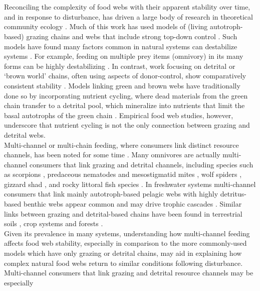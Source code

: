 \documentclass[12pt,a4paper,oneside]{article}
\begin{document}
\pagebreak
{}\\
\\
\indent Reconciling the complexity of food webs with their apparent stability over time, and in response to disturbance, has driven a large body of research in theoretical community ecology \citep{Pimm:1982,Polis:1998}. Much of this work has used models of (living autotroph-based) grazing chains and webs \citep[the `green world,'][]{Hairston:1960kx} that include strong top-down control \citep{Pimm:1982,McCann:1997}. Such models have found many factors common in natural systems can destabilize systems \citep{Holt:1994,Tanabe:2005jc}. For example, feeding on multiple prey items (omnivory) in its many forms can be highly destabilizing \citep{Holt:1994}. In contrast, work focusing on detrital or `brown world' chains, often using aspects of donor-control, show comparatively consistent stability \citep{Moore:2004,Blanchard:2011}. Models linking green and brown webs have traditionally done so by incorporating nutrient cycling, where dead materials from the green chain transfer to a detrital pool, which  mineralize into nutrients that limit the basal autotrophs of the green chain \citep{DeAngelis:1992, DeAngelis:1989}. Empirical food web studies, however, underscore that nutrient cycling is not the only connection between grazing and detrital webs.
\\
\indent Multi-channel \citep{Odum:1969,Moore:1988,Polis:1996} or multi-chain \citep{Vadeboncoeur:2005} feeding, where consumers link distinct resource channels, has been noted for some time \citep{Odum:1984}. Many omnivores are actually
multi-channel consumers that link grazing and
detrital channels, including species such as scorpions
\citep{Polis:1987}, predaceous nematodes and mesostigmatid mites \citep{Moore:1988}, wolf spiders \citep{Fagan:1997}, gizzard shad
\citep{Nowlin:2008}, and rocky littoral fish species
\citep{Pinnegar:2000}. In freshwater systems multi-channel consumers
that link mainly autotroph-based pelagic webs with highly
detritus-based benthic webs appear common and may drive trophic cascades
\citep{Vadeboncoeur:2002,Vadeboncoeur:2005}. Similar links between grazing and detrital-based chains
have been found in terrestrial soils \citep{Hunt:1987nw}, crop systems \citep{Settle:1996} and
forests \citep{Miyashita:2003}.
\\
\indent Given its prevalence in many systems, understanding how multi-channel feeding affects food web stability, especially in comparison to the more commonly-used models which have only grazing or detrital chains, may aid in explaining how complex natural food webs return to similar conditions following disturbance. Multi-channel consumers that link grazing and detrital resource channels may be especially
\end{document}
